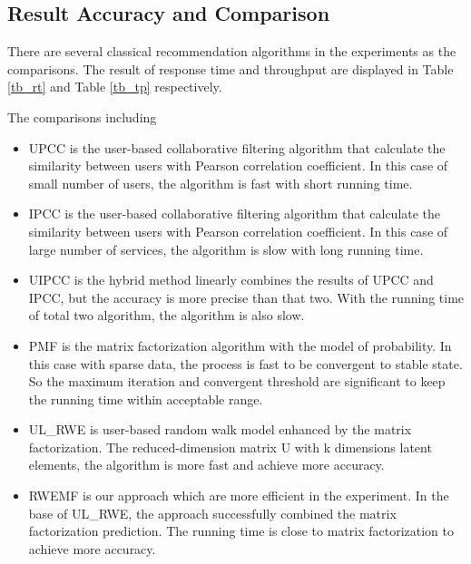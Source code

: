 \documentclass[conference]{IEEEtran}
\begin{document}
\subsection{Result Accuracy and Comparison}
\par There are several classical recommendation algorithms in the experiments as the comparisons. The result of response time and throughput
 are displayed in Table \ref{tb_rt} and Table \ref{tb_tp} respectively.
\par The comparisons including
\begin{itemize}
\item UPCC is the user-based collaborative filtering algorithm that calculate the similarity between users with Pearson correlation coefficient. In this case of small number of users, the algorithm is fast with short running time. 
\item IPCC is the user-based collaborative filtering algorithm that calculate the similarity between users with Pearson correlation coefficient. In this case of large number of services, the algorithm is slow with long running time. 
\item UIPCC is the hybrid method linearly combines the results of UPCC and IPCC, but the accuracy is more precise than that two. With the running time of total two algorithm, the algorithm is also slow.
\item PMF is the matrix factorization algorithm with the model of probability. In this case with sparse data, the process is fast to be convergent to stable state. So the maximum iteration and convergent threshold are significant to keep the running time within acceptable range.
\item UL\_RWE is user-based random walk model enhanced by the matrix factorization. The reduced-dimension matrix U with k dimensions latent elements, the algorithm is more fast and achieve more accuracy.
\item RWEMF is our approach which are more efficient in the experiment. In the base of UL\_RWE, the approach successfully combined the matrix factorization prediction. The running time is close to matrix factorization to achieve more accuracy.
\end{itemize}
\end{document}
